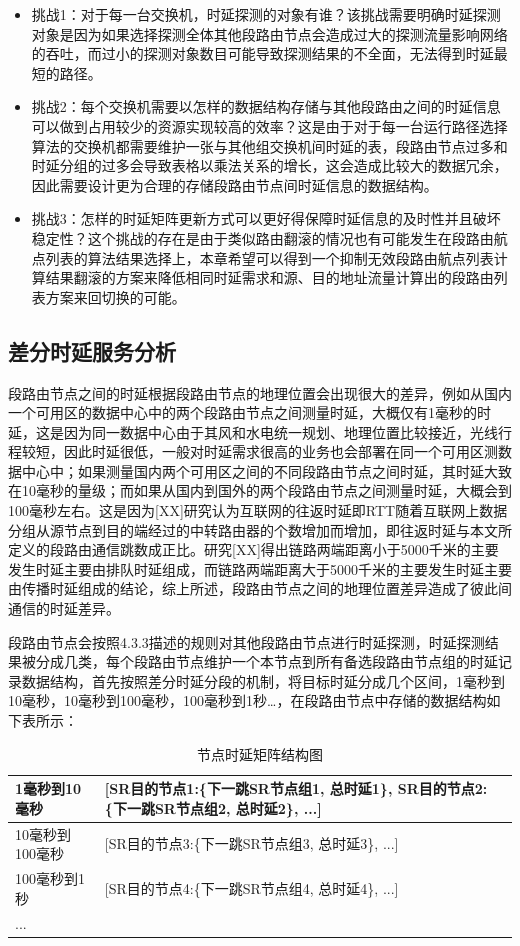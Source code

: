 \begin{itemize}
\item 挑战1：对于每一台交换机，时延探测的对象有谁？该挑战需要明确时延探测对象是因为如果选择探测全体其他段路由节点会造成过大的探测流量影响网络的吞吐，而过小的探测对象数目可能导致探测结果的不全面，无法得到时延最短的路径。
\item 挑战2：每个交换机需要以怎样的数据结构存储与其他段路由之间的时延信息可以做到占用较少的资源实现较高的效率？这是由于对于每一台运行路径选择算法的交换机都需要维护一张与其他组交换机间时延的表，段路由节点过多和时延分组的过多会导致表格以乘法关系的增长，这会造成比较大的数据冗余，因此需要设计更为合理的存储段路由节点间时延信息的数据结构。
\item 挑战3：怎样的时延矩阵更新方式可以更好得保障时延信息的及时性并且破坏稳定性？这个挑战的存在是由于类似路由翻滚的情况也有可能发生在段路由航点列表的算法结果选择上，本章希望可以得到一个抑制无效段路由航点列表计算结果翻滚的方案来降低相同时延需求和源、目的地址流量计算出的段路由列表方案来回切换的可能。
\end{itemize}

\subsection{差分时延服务分析}

段路由节点之间的时延根据段路由节点的地理位置会出现很大的差异，例如从国内一个可用区的数据中心中的两个段路由节点之间测量时延，大概仅有1毫秒的时延，这是因为同一数据中心由于其风和水电统一规划、地理位置比较接近，光线行程较短，因此时延很低，一般对时延需求很高的业务也会部署在同一个可用区测数据中心中；如果测量国内两个可用区之间的不同段路由节点之间时延，其时延大致在10毫秒的量级；而如果从国内到国外的两个段路由节点之间测量时延，大概会到100毫秒左右。这是因为[XX]研究认为互联网的往返时延即RTT随着互联网上数据分组从源节点到目的端经过的中转路由器的个数增加而增加，即往返时延与本文所定义的段路由通信跳数成正比。研究[XX]得出链路两端距离小于5000千米的主要发生时延主要由排队时延组成，而链路两端距离大于5000千米的主要发生时延主要由传播时延组成的结论，综上所述，段路由节点之间的地理位置差异造成了彼此间通信的时延差异。

段路由节点会按照4.3.3描述的规则对其他段路由节点进行时延探测，时延探测结果被分成几类，每个段路由节点维护一个本节点到所有备选段路由节点组的时延记录数据结构，首先按照差分时延分段的机制，将目标时延分成几个区间，1毫秒到10毫秒，10毫秒到100毫秒，100毫秒到1秒…，在段路由节点中存储的数据结构如下表所示：

\begin{table}[]
\begin{tabular}{|p{}|p{}|}
\hline
1毫秒到10毫秒 & {[}SR目的节点1:\{下一跳SR节点组1, 总时延1\}, SR目的节点2:\{下一跳SR节点组2, 总时延2\}, ...{]} \\ \hline
10毫秒到100毫秒 & {[}SR目的节点3:\{下一跳SR节点组3, 总时延3\}, ...{]} \\ \hline
100毫秒到1秒 & {[}SR目的节点4:\{下一跳SR节点组4, 总时延4\}, ...{]} \\ \hline
... &  \\ \hline
\end{tabular}
\caption{节点时延矩阵结构图}
\label{table-delay-metric}
\end{table}

